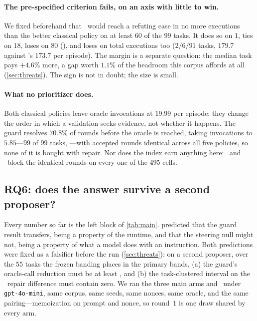 \paragraph{The pre-specified criterion fails, on an axis with little to win.}
We fixed beforehand that \polguard\ would reach a refuting case in no more
executions than the better classical policy on at least $60$ of the $99$ tasks.
It does so on $1$, ties on $18$, loses on $80$ (), and loses on total
executions too ($2/6/91$ tasks, $179.7$ against \polven's $173.7$ per episode).
The margin is a separate question: the median task pays $+4.6\%$ more, a gap
worth $1.1\%$ of the headroom this corpus affords at all
(\cref{sec:threats}). The sign is not in doubt; the size is small.

\paragraph{What no prioritizer does.}
Both classical policies leave oracle invocations at $19.99$ per episode: they
change the order in which a validation seeks evidence, not whether it happens.
The guard resolves $70.8\%$ of rounds before the oracle is reached, taking
invocations to $5.85$---$99$ of $99$ tasks, ---with accepted
rounds identical across all five policies, so none of it is bought with repair.
Nor does the index earn anything here: \polguard\ and \poldedup\ block the
identical rounds on every one of the \num{495} cells.

\fullonly{}

\subsection{RQ6: does the answer survive a second proposer?}
\label{sec:results-scale}

Every number so far is the left block of \cref{tab:main}.  predicted that the guard
result transfers, being a property of the runtime, and that the steering null
might not, being a property of what a model does with an instruction. Both
predictions were fixed as a falsifier before the run (\cref{sec:threats}): on a
second proposer, over the $55$ tasks the frozen banding places in the primary
bands, (a) the guard's oracle-call reduction must be at least , and
(b) the task-clustered interval on the \armsteer\ repair difference must
contain zero. We ran the three main arms and \armsteer\ under
\texttt{gpt-4o-mini}, same corpus, same seeds, same nonces, same oracle, and
the same pairing---memoization on prompt and nonce, so round~$1$ is one draw
shared by every arm.

